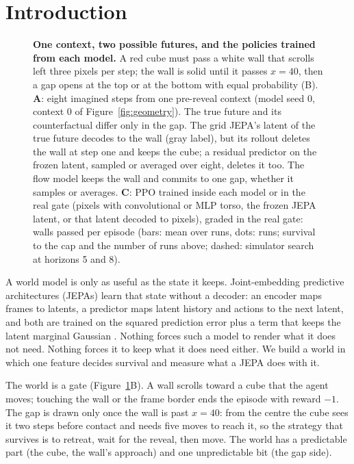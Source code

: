\section{Introduction}
\label{sec:intro}

\begin{figure}[t]
\centering
{}
\caption{\textbf{One context, two possible futures, and the policies trained from each model.} A red
cube must pass a white wall that scrolls left three pixels per step; the wall is solid until it passes
$x=40$, then a gap opens at the top or at the bottom with equal probability (B). \textbf{A}: eight
imagined steps from one pre-reveal context (model seed $0$, context $0$ of Figure~\ref{fig:geometry}). The true future and its counterfactual differ only in the gap. The grid JEPA's latent of the true future decodes to the wall (gray label), but its rollout deletes the wall at step one and keeps the cube; a residual predictor on the frozen latent, sampled or averaged over eight, deletes it too. The flow model keeps the wall and commits to one gap,
whether it samples or averages. \textbf{C}: PPO trained inside each model or in the real gate (pixels with convolutional or MLP torso, the frozen JEPA latent, or that latent decoded to pixels), graded in the real gate: walls passed per episode (bars: mean over runs, dots: runs; survival to the cap and the number of runs above; dashed: simulator search at horizons 5 and 8).}
\label{fig:hero}
\end{figure}

A world model is only as useful as the state it keeps. Joint-embedding predictive architectures
(JEPAs) learn that state without a decoder: an encoder maps frames to latents, a predictor maps latent
history and actions to the next latent, and both are trained on the squared prediction error plus a
term that keeps the latent marginal Gaussian
\citep{lecun2022path,assran2023ijepa,balestriero2025lejepa,maes2026lewm}. Nothing forces such a model
to render what it does not need. Nothing forces it to keep what it does need either. We build a
world in which one feature decides survival and measure what a JEPA does with it.

The world is a gate (Figure~\ref{fig:hero}B). A wall scrolls toward a cube that the agent moves;
touching the wall or the frame border ends the episode with reward $-1$. The gap is drawn only once
the wall is past $x=40$: from the centre the cube sees it two steps before contact and needs five
moves to reach it, so the strategy that survives is to retreat, wait for the reveal, then move. The world
has a predictable part (the cube, the wall's approach) and one unpredictable bit (the gap side).

